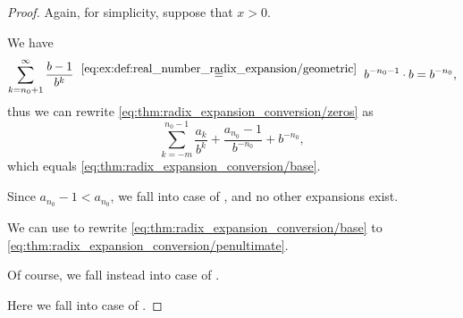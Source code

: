 \begin{proof}
  Again, for simplicity, suppose that \( x > 0 \).


   We have
  \begin{equation*}
    \sum_{k=n_0 + 1}^\infty \frac {b - 1} {b^k}
    \reloset {\eqref{eq:ex:def:real_number_radix_expansion/geometric}} =
    b^{-n_0-1} \cdot b
    =
    b^{-n_0},
  \end{equation*}
  thus we can rewrite \eqref{eq:thm:radix_expansion_conversion/zeros} as
  \begin{equation*}
    \sum_{k=-m}^{n_0 - 1} \frac {a_k} {b^k} + \frac {a_{n_0} - 1} {b^{-n_0}} + b^{-n_0},
  \end{equation*}
  which equals \eqref{eq:thm:radix_expansion_conversion/base}.

   Since \( a_{n_0} - 1 < a_{n_0} \), we fall into case  of , and no other expansions exist.

   We can use  to rewrite \eqref{eq:thm:radix_expansion_conversion/base} to \eqref{eq:thm:radix_expansion_conversion/penultimate}.

  Of course, we fall instead into case  of .

   Here we fall into case  of .
\end{proof}

